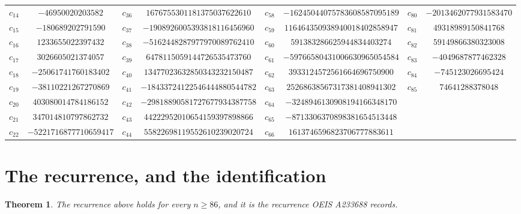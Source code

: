 \documentclass[11pt,a4paper]{article}
\theoremstyle{plain}
\newtheorem{theorem}{Theorem}
\theoremstyle{definition}
\begin{document}
\begin{center}
\begin{tabular}{cccccccc}
$c_{14}$ & $-46950020203582$ & $c_{36}$ & $1676755301181375037622610$ & $c_{58}$ & $-16245044075783608587095189$ & $c_{80}$ & $-2013462077931583470$ \\
$c_{15}$ & $-180689202791590$ & $c_{37}$ & $-1908926005393818116456960$ & $c_{59}$ & $116464350938940018402858947$ & $c_{81}$ & $49318989150841768$ \\
$c_{16}$ & $1233655022397432$ & $c_{38}$ & $-5162448287977970089762410$ & $c_{60}$ & $591383286625944834403274$ & $c_{82}$ & $59149866380323008$ \\
$c_{17}$ & $3026605021374057$ & $c_{39}$ & $6478115059144726535473760$ & $c_{61}$ & $-59766580431006630965054584$ & $c_{83}$ & $-4049687877462328$ \\
$c_{18}$ & $-25061741760183402$ & $c_{40}$ & $13477023632850343232150487$ & $c_{62}$ & $3933124572561664696750900$ & $c_{84}$ & $-745123026695424$ \\
$c_{19}$ & $-38110221267270869$ & $c_{41}$ & $-18433724122546444880544782$ & $c_{63}$ & $25268638567317381408941302$ & $c_{85}$ & $74641288378048$ \\
$c_{20}$ & $403080014784186152$ & $c_{42}$ & $-29818890581727677934387758$ & $c_{64}$ & $-3248946130908194166348170$ &  &  \\
$c_{21}$ & $347014810797862732$ & $c_{43}$ & $44222952010654159397898866$ & $c_{65}$ & $-8713306370898381654513448$ &  &  \\
$c_{22}$ & $-5221716877710659417$ & $c_{44}$ & $55822698119552610239020724$ & $c_{66}$ & $1613746596823706777883611$ &  &  \\
\end{tabular}
\end{center}

\section{The recurrence, and the identification}

\begin{theorem}
The recurrence above holds for every $n\ge86$, and it is the recurrence OEIS A233688 records.
\end{theorem}
\end{document}
